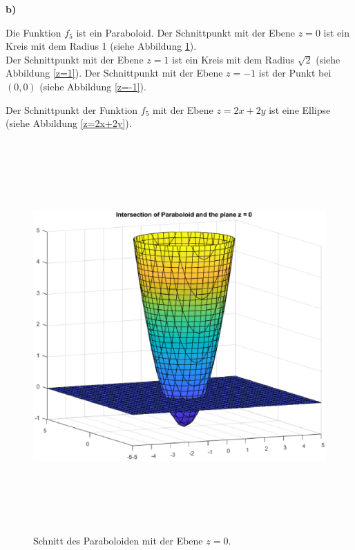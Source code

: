 {\textbf{b)}
\begin{iii}
\item Die Funktion $f_5$ ist ein Paraboloid. Der Schnittpunkt mit der Ebene $z = 0$ ist ein Kreis mit dem Radius 1 (siehe Abbildung \ref{z=0}).\\
Der Schnittpunkt mit der Ebene $z = 1$ ist ein Kreis mit dem Radius $\sqrt{2}$ (siehe Abbildung \ref{z=1}). 
Der Schnittpunkt mit der Ebene $z = -1$ ist der Punkt bei $(0,0)$ (siehe Abbildung \ref{z=-1}). 
\item Der Schnittpunkt der Funktion $f_5$ mit der Ebene $z =2x+2y$ ist eine Ellipse (siehe Abbildung \ref{z=2x+2y}).
\end{iii}
\begin{figure}[ht]
\begin{center}
\includegraphics[width=15cm, height=15cm]{../A/analysis/isolines_and_isosurfaces_001_bi1.eps}
\caption{Schnitt des Paraboloiden mit der Ebene $z=0$.}
\label{z=0}
\end{center}
\end{figure}

}
